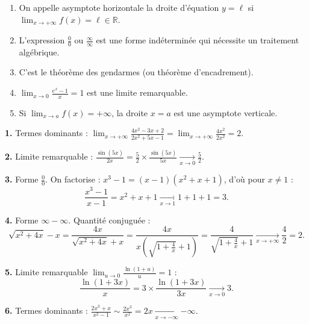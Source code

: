 \documentclass[11pt]{article}
\newcommand{\cle}[1]{{\popxbold\color{popdark}#1}}
\begin{document}
\begin{corrige}
\begin{enumerate}
    \item On appelle \cle{asymptote horizontale} la droite d'équation $y = \ell$ si $\lim_{x \to +\infty} f(x) = \ell \in \mathbb{R}$.
    \item L'expression $\frac{0}{0}$ ou $\frac{\infty}{\infty}$ est une \cle{forme indéterminée} qui nécessite un traitement algébrique.
    \item C'est le \cle{théorème des gendarmes} (ou théorème d'encadrement).
    \item $\lim_{x \to 0} \frac{e^x - 1}{x} = 1$ est une \cle{limite remarquable}.
    \item Si $\lim_{x \to a} f(x) = +\infty$, la droite $x = a$ est une \cle{asymptote verticale}.
\end{enumerate}
\end{corrige}

\begin{corrige}
\textbf{1.} Termes dominants : $\displaystyle \lim_{x \to +\infty} \frac{4x^2 - 3x + 2}{2x^2 + 5x - 1} = \lim_{x \to +\infty} \frac{4x^2}{2x^2} = \boxed{2}$.

\textbf{2.} Limite remarquable : $\displaystyle \frac{\sin(5x)}{2x} = \frac{5}{2} \times \frac{\sin(5x)}{5x} \xrightarrow[x \to 0]{} \boxed{\frac{5}{2}}$.

\textbf{3.} Forme $\frac{0}{0}$. On factorise : $x^3 - 1 = (x-1)(x^2 + x + 1)$, d'où pour $x \neq 1$ :
\[ \frac{x^3 - 1}{x - 1} = x^2 + x + 1 \xrightarrow[x \to 1]{} 1 + 1 + 1 = \boxed{3}. \]

\textbf{4.} Forme $\infty - \infty$. Quantité conjuguée :
\[ \sqrt{x^2 + 4x} - x = \frac{4x}{\sqrt{x^2 + 4x} + x} = \frac{4x}{x\left(\sqrt{1 + \frac{4}{x}} + 1\right)} = \frac{4}{\sqrt{1 + \frac{4}{x}} + 1} \xrightarrow[x \to +\infty]{} \frac{4}{2} = \boxed{2}. \]

\textbf{5.} Limite remarquable $\lim_{u \to 0} \frac{\ln(1+u)}{u} = 1$ :
\[ \frac{\ln(1+3x)}{x} = 3 \times \frac{\ln(1+3x)}{3x} \xrightarrow[x \to 0]{} \boxed{3}. \]

\textbf{6.} Termes dominants : $\displaystyle \frac{2x^3 + x}{x^2 - 1} \sim \frac{2x^3}{x^2} = 2x \xrightarrow[x \to -\infty]{} \boxed{-\infty}$.
\end{corrige}
\end{document}
